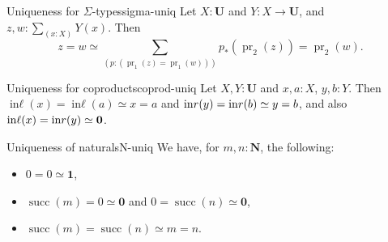 \documentclass{article}
\newcommand{\U}{\mathbf{U}}
\newcommand{\tsigma}[1]{\sum_{(#1)}}
\DeclareMathOperator{\pr}{pr}
\newcommand{\1}{\textbf{1}}
\newcommand{\0}{\mathbf{0}}
\DeclareMathOperator{\inl}{in\ell}
\DeclareMathOperator{\inr}{in\mathnormal{r}}
\newcommand{\2}{\textbf{2}}
\newcommand{\N}{\textbf{N}}
\renewcommand{\succ}{\operatorname{succ}}
\begin{document}
\begin{thm}{Uniqueness for \( \Sigma \)-types}{sigma-uniq} Let \( X : \U \) and \( Y : X \to \U \), and \( z, w : \tsigma{x : X} Y(x) \). Then
\[ z = w \simeq \tsigma{p : (\pr_{1}(z) = \pr_{1}(w))} p_{\ast}(\pr_{2}(z)) = \pr_{2}(w). \]
\end{thm}
\begin{thm}{Uniqueness for coproducts}{coprod-uniq} Let \( X, Y : \U \) and \( x, a : X \), \( y, b : Y \). Then \( \inl(x) = \inl(a) \simeq x = a \) and \( \inr(y) = \inr(b) \simeq y = b \), and also \( \inl(x) = \inr(y) \simeq \0 \). \end{thm}
\begin{thm}{Uniqueness of naturals}{N-uniq} We have, for \( m, n : \N \), the following:
\begin{itemize}
	\item \( 0 = 0 \simeq \1 \),
	\item \( \succ(m) = 0 \simeq \0 \) and \( 0 = \succ(n) \simeq \0 \),
	\item \( \succ(m) = \succ(n) \simeq m = n \).
\end{itemize}
 \end{thm}
\end{document}
